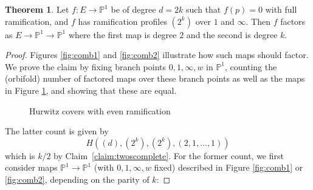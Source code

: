 \documentclass[thesis]{thesis-umich}           %
\renewcommand{\P}{\mathbb P}
\theoremstyle{definition}
\newtheorem{thm}{Theorem}[section]
\begin{document}
\begin{thm}
  \label{thm:combinatorial}
  Let $f:E\to\P^1$ be of degree $d=2k$ such that $f(p)=0$ with full ramification,
  and $f$ has ramification profiles $(2^k)$ over $1$ and $\infty$. Then $f$ factors as
  $E\to\P^1\to\P^1$ where the first map is degree $2$ and the second is degree $k$.
\end{thm}
\begin{proof}
  Figures \ref{fig:comb1} and \ref{fig:comb2} illustrate how such maps should factor. We prove the claim by fixing branch points $0,1,\infty,w$ in $\P^1$, counting the (orbifold) number of factored
  maps over these branch points as well as the maps in Figure \ref{fig:twos}, and showing that these are equal.

\begin{figure}[h]
  \caption{Hurwitz covers with even ramification}
  \centering
{}

\label{fig:twos}
\end{figure}

  The latter count is given by
  \[
  H((d),(2^k),(2^k),(2,1,\dots,1))
  \]
  which is $k/2$ by Claim~\ref{claim:twoscomplete}. For the former count, we
  first consider maps $\P^1\to\P^1$  (with $0,1,\infty,w$ fixed)
  described in Figure \ref{fig:comb1} or \ref{fig:comb2}, depending on the parity of $k$:


\end{proof}
\end{document}
